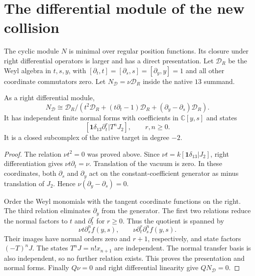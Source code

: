 \section{The differential module of the new collision}

The cyclic module $N$ is minimal over regular position functions.
Its closure under right differential operators is larger and has a direct presentation.
Let $\mathcal D_R$ be the Weyl algebra in $t,s,y$, with $[\partial_t,t]=[\partial_s,s]=[\partial_y,y]=1$ and all other coordinate commutators zero.
Let $N_{\mathcal D}=\nu\mathcal D_R$ inside the native $13$ summand.

\begin{proposition}\label{prop:bdnz-weyl}
As a right differential module,
\begin{equation}\label{eq:bdnz-weyl-presentation}
 N_{\mathcal D}\cong
 \mathcal D_R\big/
 \left(t^2\mathcal D_R+(t\partial_t-1)\mathcal D_R
                 +(\partial_y-\partial_s)\mathcal D_R\right).
\end{equation}
It has independent finite normal forms with coefficients in $\mathbb C[y,s]$ and states
\[
 [\mathbf1\delta_{13}\partial_t^r|T^nJ_2],
 \qquad r,n\geq0.
\]
It is a closed subcomplex of the native target in degree $-2$.
\end{proposition}
\begin{proof}
The relation $\nu t^2=0$ was proved above.
Since $\nu t=k[\mathbf1\delta_{13}|J_2]$, right differentiation gives
$\nu t\partial_t=\nu$.
Translation of the vacuum is zero.
In these coordinates, both $\partial_s$ and $\partial_y$ act on the constant-coefficient generator as minus translation of $J_2$.
Hence $\nu(\partial_y-\partial_s)=0$.

Order the Weyl monomials with the tangent coordinate functions on the right.
The third relation eliminates $\partial_y$ from the generator.
The first two relations reduce the normal factors to $t$ and $\partial_t^r$ for $r\geq0$.
Thus the quotient is spanned by
\[
 \nu t\partial_s^n f(y,s),\qquad
 \nu\partial_t^r\partial_s^n f(y,s).
\]
Their images have normal orders zero and $r+1$, respectively, and state factors $(-T)^nJ$.
The states $T^nJ=n!x_{n+1}$ are independent.
The normal transfer basis is also independent, so no further relation exists.
This proves the presentation and normal forms.
Finally $Q\nu=0$ and right differential linearity give $QN_{\mathcal D}=0$.
\end{proof}

